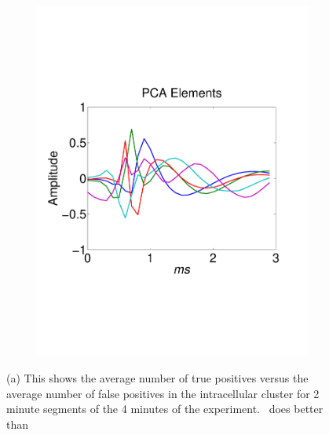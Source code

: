 
\begin{center}
\begin{figure}[h!]
\begin{subfigure}[b]{.3\textwidth}
\includegraphics[width=\textwidth]{../figs/new/pcaelements.pdf}
\caption{}
\label{fig:ICold}
\end{subfigure}
\begin{subfigure}[b]{.3\textwidth}
\caption{}
\label{fig:ICold}
\end{subfigure}
\begin{subfigure}[b]{.3\textwidth}
\caption{}
\label{fig:ICold}
\end{subfigure}
\caption{ 
} \label{fig:timing}
\end{figure}
\end{center}

\begin{figure}[htbp]
	\centering
	\caption{(a) This shows the average number of true positives versus the average number of false positives in the intracellular cluster for 2 minute segments of the 4 minutes of the experiment.  \smug\ does better than     }
	\label{fig:asdf}
\end{figure}


